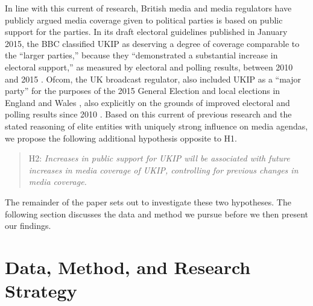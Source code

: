 \documentclass[12pt,]{article}
\begin{document}
In line with this current of research, British media and media
regulators have publicly argued media coverage given to political
parties is based on public support for the parties. In its draft
electoral guidelines published in January 2015, the BBC classified UKIP
as deserving a degree of coverage comparable to the ``larger parties,''
because they ``demonstrated a substantial increase in electoral
support,'' as measured by electoral and polling results, between 2010
and 2015 \citep{Sweeney:wp, BBC:R6UMvIKM}. Ofcom, the UK broadcast
regulator, also included UKIP as a ``major party'' for the purposes of
the 2015 General Election and local elections in England and Wales
\citep{Ofcom:2015tt}, also explicitly on the grounds of improved
electoral and polling results since 2010 \citep{Wintour:vf}. Based on
this current of previous research and the stated reasoning of elite
entities with uniquely strong influence on media agendas, we propose the
following additional hypothesis opposite to H1.

\begin{quote}
H2: \emph{Increases in public support for UKIP will be associated with future
increases in media coverage of UKIP, controlling for previous changes in
media coverage.}
\end{quote}

The remainder of the paper sets out to investigate these two hypotheses.
The following section discusses the data and method we pursue before we
then present our findings.

\section{Data, Method, and Research
Strategy}\label{data-method-and-research-strategy}
\end{document}
